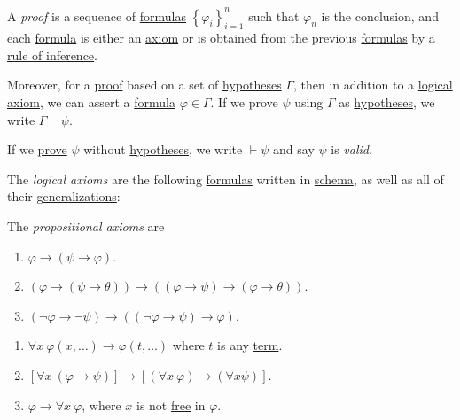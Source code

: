 \begin{definition}[Proof]\label{def:proof}
	A \emph{proof} is a sequence of \hyperref[def:formula]{formulas} \(\left\{ \varphi _i \right\} _{i=1}^n\) such that \(\varphi _n\) is the conclusion, and each \hyperref[def:formula]{formula} is either an \hyperref[def:logical-axioms]{axiom} or is obtained from the previous \hyperref[def:formula]{formulas} by a \hyperref[def:rule-of-inference]{rule of inference}.

	Moreover, for a \hyperref[def:proof]{proof} based on a set of \hyperref[not:hypothesis]{hypotheses} \(\Gamma \), then in addition to a \hyperref[def:logical-axioms]{logical axiom}, we can assert a \hyperref[def:formula]{formula} \(\varphi \in \Gamma \). If we prove \(\psi \) using \(\Gamma \) as \hyperref[not:hypothesis]{hypotheses}, we write \(\Gamma \vdash \psi \).

	\begin{definition}[Valid]\label{def:valid}
		If we \hyperref[def:proof]{prove} \(\psi \) without \hyperref[not:hypothesis]{hypotheses}, we write \(\vdash \psi \) and say \(\psi \) is \emph{valid}.
	\end{definition}

	\begin{definition}\label{def:logical-axioms}
		The \emph{logical axioms} are the following \hyperref[def:formula]{formulas} written in \hyperref[not:schema]{schema}, as well as all of their \hyperref[def:generalization]{generalizations}:
		\begin{definition}\label{def:propositional-axioms}
			The \emph{propositional axioms} are
			\begin{enumerate}[label=(A\arabic*), resume*]
				\item\label{A1} \(\varphi \to  (\psi \to \varphi )\).
				\item\label{A2} \((\varphi \to (\psi \to \theta )) \to ((\varphi \to  \psi ) \to (\varphi \to \theta ))\).
				\item\label{A3} \((\lnot \varphi \to \lnot \psi ) \to  ((\lnot \varphi \to \psi ) \to \varphi )\).
			\end{enumerate}
		\end{definition}

		\begin{enumerate}[label=(A\arabic*), resume]
			\item\label{A4} \(\forall x\ \varphi (x, \ldots ) \to \varphi (t, \ldots )\) where \(t\) is any \hyperref[def:term]{term}.
			\item\label{A5} \(\left[ \forall x\ (\varphi \to \psi ) \right] \to \left[ (\forall x\ \varphi ) \to (\forall x \psi ) \right] \).
			\item\label{A6} \(\varphi \to  \forall x\ \varphi \), where \(x\) is not \hyperref[def:free-variable]{free} in \(\varphi \).
		\end{enumerate}


\end{definition}
\end{definition}
